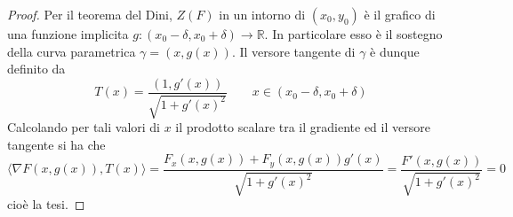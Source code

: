 \begin{proof}
    Per il teorema del Dini, $Z(F)$ in un intorno di $(x_0, y_0)$ è il grafico di una funzione implicita $g: (x_0- \delta, x_0+ \delta) \to \mathbb{R}$. In particolare esso è il sostegno della curva parametrica $\gamma = (x, g(x))$. Il versore tangente di $\gamma$ è dunque definito da
    \begin{equation*}
        T(x)= \frac{(1, g'(x))}{\sqrt{1+g'(x)^2}} \qquad x \in (x_0- \delta, x_0+ \delta)
    \end{equation*}
    Calcolando per tali valori di $x$ il prodotto scalare tra il gradiente ed il versore tangente si ha che
    \begin{equation*}
        \langle \nabla F (x, g(x)), T(x) \rangle= \frac{F_x(x, g(x)) + F_y(x, g(x))g'(x)}{\sqrt{1+g'(x)^2}}=\frac{F'(x, g(x))}{\sqrt{1+g'(x)^2}}=0
    \end{equation*}
    cioè la tesi.
\end{proof}


